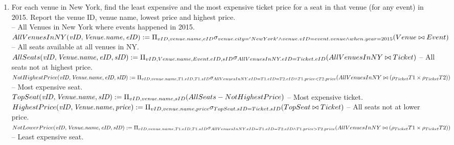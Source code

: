 \documentclass{article}
\newcommand{\var}[1]{\mathit{#1}}
\begin{document}
\begin{enumerate}
\item   %
For each venue in New York, 
find the least expensive and the most expensive ticket price for a seat in that venue (for any event) in 2015.
Report the venue ID, venue name, lowest price and highest price.\\[5pt]
-- All Venues in New York where events happened in 2015. \\[5pt]
{ \large
$
AllVenuesInNY(\var{vID, Venue.name, eID}) := \\
	\Pi_{vID, venue.name, eID} 
	\sigma_{
		venue.city='New York' \wedge
		venue.vID=event.venue \wedge 
		when.year=2015 
		} \\
	(Venue \bowtie Event) \\[10pt]
$
}
-- All seats available at all venues in NY. \\[5pt]
{ \large
$
AllSeats(\var{vID, Venue.name, eID, sID}) := 
	\Pi_{vID, Venue.name, Event.eID, sID} 
	\sigma_{
		AllVenuesInNY.eID=Ticket.eID
		} \\
	(AllVenuesInNY \bowtie Ticket) \\[40pt]
$
}
-- All seats not at highest price. \\[5pt]
{ \large
$
NotHighestPrice(\var{vID, Venue.name, eID, sID}) := \\
	\Pi_{vID, venue.name, T1.eID, T1.sID} 
	\sigma_{
		AllVenuesInNY.eID=T1.eID=T2.eID \wedge
		T1.price < T2.price
		}\\
	(AllVenuesInNY \bowtie (\rho_{Ticket}T1 \times \rho_{Ticket}T2)) \\[10pt]
$
}
-- Most expensive seat. \\[5pt]
{ \large
$
TopSeat(\var{vID, Venue.name, sID}) := 
	\Pi_{vID, venue.name, sID} 
	(AllSeats - NotHighestPrice) \\[10pt]
$
}
-- Most expensive ticket. \\[5pt]
{ \large
$
HighestPrice(\var{vID, Venue.name, price}) := \\
	\Pi_{vID, venue.name, price} 
	\sigma_{
		TopSeat.sID=Ticket.sID }
	(TopSeat \bowtie Ticket) \\[10pt]
$
}
-- All seats not at lower price. \\[5pt]
{ \large
$
NotLowerPrice(\var{vID, Venue.name, eID, sID}) := 
	\Pi_{vID, venue.name, T1.eID, T1.sID} \\
	\sigma_{
		AllVenuesInNY.eID=T1.eID=T2.eID \wedge
		T1.price > T2.price
		}
	(AllVenuesInNY \bowtie (\rho_{Ticket}T1 \times \rho_{Ticket}T2)) \\[10pt]
$
}
-- Least expensive seat. \\[5pt]

\end{enumerate}
\end{document}
